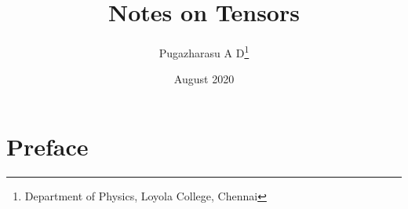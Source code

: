 \documentclass[a4paper,12pt]{book}
\begin{document}
\title{Notes on  Tensors}
\author{Pugazharasu A D\footnote{Department of Physics, Loyola College, Chennai}}
\date{August 2020}

\frontmatter
\maketitle
\chapter*{Preface}
\tableofcontents

\mainmatter




\backmatter
\end{document}
